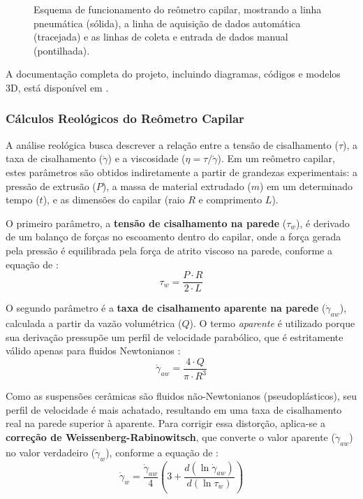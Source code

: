 \documentclass[article,12pt,oneside,a4paper,english,brazil,sumario=tradicional]{abntex2}
\begin{document}
\begin{figure}[htbp]
{
}
\caption{Esquema de funcionamento do reômetro capilar, mostrando a linha pneumática (sólida), a linha de aquisição de dados automática (tracejada) e as linhas de coleta e entrada de dados manual (pontilhada).}
\label{fig:esquema_reometro}
\end{figure}

 A documentação completa do projeto, incluindo diagramas, códigos e modelos 3D, está disponível em .


\subsubsection{Cálculos Reológicos do Reômetro Capilar}
\label{subsubsec:calculos}

A análise reológica busca descrever a relação entre a tensão de cisalhamento ($\tau$), a taxa de cisalhamento ($\dot{\gamma}$) e a viscosidade ($\eta = \tau / \dot{\gamma}$). Em um reômetro capilar, estes parâmetros são obtidos indiretamente a partir de grandezas experimentais: a pressão de extrusão ($P$), a massa de material extrudado ($m$) em um determinado tempo ($t$), e as dimensões do capilar (raio $R$ e comprimento $L$).

O primeiro parâmetro, a \textbf{tensão de cisalhamento na parede} ($\tau_w$), é derivado de um balanço de forças no escoamento dentro do capilar, onde a força gerada pela pressão é equilibrada pela força de atrito viscoso na parede, conforme a equação de :
\begin{equation}
    \tau_w = \frac{P \cdot R}{2 \cdot L}
\end{equation}

O segundo parâmetro é a \textbf{taxa de cisalhamento aparente na parede} ($\dot{\gamma}_{aw}$), calculada a partir da vazão volumétrica ($Q$). O termo \textit{aparente} é utilizado porque sua derivação pressupõe um perfil de velocidade parabólico, que é estritamente válido apenas para fluidos Newtonianos :
\begin{equation}
    \dot{\gamma}_{aw} = \frac{4 \cdot Q}{\pi \cdot R^3}
\end{equation}

Como as suspensões cerâmicas são fluidos não-Newtonianos (pseudoplásticos), seu perfil de velocidade é mais achatado, resultando em uma taxa de cisalhamento real na parede superior à aparente. Para corrigir essa distorção, aplica-se a \textbf{correção de Weissenberg-Rabinowitsch}, que converte o valor aparente ($\dot{\gamma}_{aw}$) no valor verdadeiro ($\dot{\gamma}_w$), conforme a equação de :
\begin{equation}
    \dot{\gamma}_w = \frac{\dot{\gamma}_{aw}}{4} \left( 3 + \frac{d(\ln \dot{\gamma}_{aw})}{d(\ln \tau_w)} \right)
\end{equation}
\end{document}
